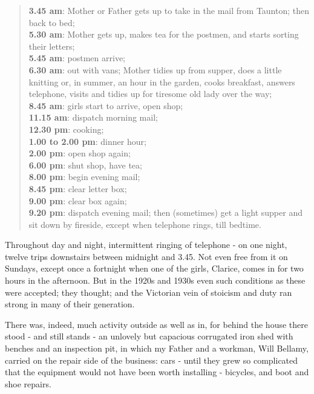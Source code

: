 \begin{quote}
\textbf{3.45 am}: Mother or Father gets up to take in the mail from Taunton; then back to bed;
\\ \textbf{5.30 am}: Mother gets up, makes tea for the postmen, and starts sorting their letters; 
\\ \textbf{5.45 am}: postmen arrive;
\\ \textbf{6.30 am}: out with vans; Mother tidies up from supper, does a little knitting or, in summer, an hour in the garden, cooks breakfast, answers telephone, visits and tidies up for tiresome old lady over the way; 
\\ \textbf{8.45 am}: girls start to arrive, open shop;
\\ \textbf{11.15 am}: dispatch morning mail;
\\ \textbf{12.30 pm}: cooking;
\\ \textbf{1.00 to 2.00 pm}: dinner hour;
\\ \textbf{2.00 pm}: open shop again;
\\ \textbf{6.00 pm}: shut shop, have tea;
\\ \textbf{8.00 pm}: begin evening mail;
\\ \textbf{8.45 pm}: clear letter box;
\\ \textbf{9.00 pm}: clear box again;
\\ \textbf{9.20 pm}:  dispatch evening mail; then (sometimes) get a light supper and sit down by fireside, except when telephone rings, till bedtime. 
\end{quote}

Throughout day and night, intermittent ringing of telephone - on one night, twelve trips downstairs between midnight and 3.45. Not even free from it on Sundays, except once a fortnight when one of the girls, Clarice, comes in for two hours in the afternoon.
But in the 1920s and 1930s even such conditions as these were accepted;  they thought; and the Victorian vein of stoicism and duty ran strong in many of their generation.

\newpage

There was, indeed, much activity outside as well as in, for behind the house there stood - and still stands - an unlovely but capacious corrugated iron shed with benches and an inspection pit, in which my Father and a workman, Will Bellamy, carried on the repair side of the business: cars - until they grew so complicated that the equipment would not have been worth installing - bicycles, and boot and shoe repairs.

